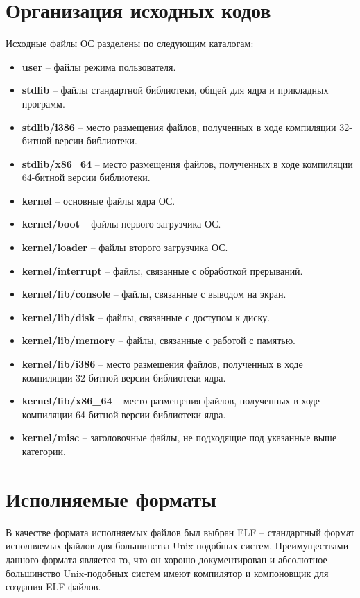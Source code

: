 \section{Организация исходных кодов}
Исходные файлы ОС разделены по следующим каталогам:
\begin{itemize}
\item \textbf{user} -- файлы режима пользователя.
\item \textbf{stdlib} -- файлы стандартной библиотеки, общей для ядра и прикладных программ.
\item \textbf{stdlib/i386} -- место размещения файлов, полученных в ходе компиляции 32-битной
	версии библиотеки.
\item \textbf{stdlib/x86\_64} -- место размещения файлов, полученных в ходе компиляции 64-битной
	версии библиотеки.
\item \textbf{kernel} -- основные файлы ядра ОС.
\item \textbf{kernel/boot} -- файлы первого загрузчика ОС.
\item \textbf{kernel/loader} -- файлы второго загрузчика ОС.
\item \textbf{kernel/interrupt} -- файлы, связанные с обработкой прерываний.
\item \textbf{kernel/lib/console} -- файлы, связанные с выводом на экран.
\item \textbf{kernel/lib/disk} -- файлы, связанные с доступом к диску.
\item \textbf{kernel/lib/memory} -- файлы, связанные с работой с памятью.
\item \textbf{kernel/lib/i386} -- место размещения файлов, полученных в ходе компиляции 32-битной
	версии библиотеки ядра.
\item \textbf{kernel/lib/x86\_64} -- место размещения файлов, полученных в ходе компиляции 64-битной
	версии библиотеки ядра.
\item \textbf{kernel/misc} -- заголовочные файлы, не подходящие под указанные выше категории.
\end{itemize}

\section{Исполняемые форматы}
В качестве формата исполняемых файлов был выбран ELF -- стандартный формат исполняемых файлов
для большинства Unix-подобных систем. Преимуществами данного формата является то, что он хорошо
документирован и абсолютное большинство Unix-подобных систем имеют компилятор и компоновщик для
создания ELF-файлов.


